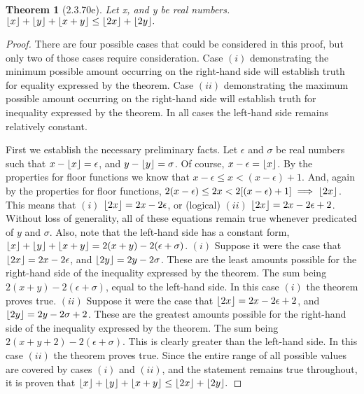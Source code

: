 \documentclass[a4paper, 12pt]{article}
\theoremstyle{plain}
\newtheorem*{theorem*}{Theorem}
\DeclarePairedDelimiter{\floor}{\lfloor}{\rfloor}
\begin{document}
	
	\begin{theorem*}[2.3.70e]
		Let x, and y be real numbers. 
		$\floor{x} + \floor{y} + \floor{x + y} \le \floor{2x} + \floor{2y}.$
	\end{theorem*}
	
	\begin{proof}
		There are four possible cases that could be considered in this proof, but only two of 
		those cases require consideration. Case $(i)$ demonstrating the minimum possible amount 
		occurring on the right-hand side will establish truth for equality expressed by the 
		theorem. Case $(ii)$ demonstrating the maximum possible amount occurring on the right-hand 
		side will establish truth for inequality expressed by the theorem. In all cases the 
		left-hand side remains relatively constant.
		
		First we establish the necessary preliminary facts. Let $\epsilon$ and $\sigma$ be real 
		numbers such that $x - \floor{x} = \epsilon$, and $y - \floor{y} = \sigma$. Of course, 
		$x - \epsilon = \floor{x}$. By the properties for floor functions we know that 
		$x-\epsilon \le x < (x - \epsilon) + 1$. And, again by the properties for floor functions,
		$2(x-\epsilon) \le 2x < 2[(x - \epsilon) + 1] \implies \floor{2x}$. This means that $(i)$ 
		$\floor{2x} = 2x-2\epsilon$, or (logical) $(ii)$ $\floor{2x} = 2x - 2\epsilon + 2$. 
		Without loss of generality, all of these equations remain true whenever predicated of $y$ 
		and $\sigma$. Also, note that the left-hand side has a constant form, 
		$\floor{x} + \floor{y} + \floor{x + y} = 2(x + y) - 2(\epsilon + \sigma)$.
		\newline
		\newline
		\indent $(i)$ Suppose it were the case that $\floor{2x} = 2x-2\epsilon$, and 
		$\floor{2y} = 2y-2\sigma$. \indent These are the least amounts possible for the right-hand 
		side of the \newline \indent inequality expressed by the theorem. The sum being 
		$2(x + y) - 2(\epsilon + \sigma)$, \indent equal to the left-hand side. In this case 
		$(i)$ the theorem proves true.
		\newline
		\newline
		\indent $(ii)$ Suppose it were the case that $\floor{2x} = 2x - 2\epsilon + 2$, and 
		\newline \indent $\floor{2y} = 2y - 2\sigma + 2$. These are the greatest amounts possible 
		for the \indent right-hand side of the inequality expressed by the theorem. The sum 
		\newline \indent being $2(x + y + 2) - 2(\epsilon + \sigma)$. This is clearly greater than 
		the left-hand \indent side. In this case $(ii)$ the theorem proves true.
		\newline
		\newline
		Since the entire range of all possible values are covered by cases $(i)$ and $(ii)$, and 
		the statement remains true throughout, it is proven that \newline 
		$\floor{x} + \floor{y} + \floor{x + y} \le \floor{2x} + \floor{2y}.$
	\end{proof}
\end{document}
